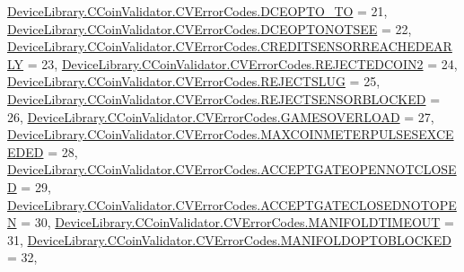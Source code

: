 \begin{DoxyCompactItemize}
\mbox{\hyperlink{group___erreur_gga68c5b73cc3b337502d9f92154d933591abcdd757e0380f69f13dff8be4d7d247f}{Device\+Library.\+C\+Coin\+Validator.\+C\+V\+Error\+Codes.\+D\+C\+E\+O\+P\+T\+O\+\_\+\+TO}} = 21, 
\mbox{\hyperlink{group___erreur_gga68c5b73cc3b337502d9f92154d933591a31c99e9aae78a22cd697c80f35779083}{Device\+Library.\+C\+Coin\+Validator.\+C\+V\+Error\+Codes.\+D\+C\+E\+O\+P\+T\+O\+N\+O\+T\+S\+EE}} = 22, 
\mbox{\hyperlink{group___erreur_gga68c5b73cc3b337502d9f92154d933591a6fd6e43dc5f964d3b48ad0c245d9dc50}{Device\+Library.\+C\+Coin\+Validator.\+C\+V\+Error\+Codes.\+C\+R\+E\+D\+I\+T\+S\+E\+N\+S\+O\+R\+R\+E\+A\+C\+H\+E\+D\+E\+A\+R\+LY}} = 23, 
\newline
\mbox{\hyperlink{group___erreur_gga68c5b73cc3b337502d9f92154d933591aed7cae4a3226e4da365e7c9c5a8d347f}{Device\+Library.\+C\+Coin\+Validator.\+C\+V\+Error\+Codes.\+R\+E\+J\+E\+C\+T\+E\+D\+C\+O\+I\+N2}} = 24, 
\mbox{\hyperlink{group___erreur_gga68c5b73cc3b337502d9f92154d933591a21aa9d7cf65b4208ae81a40097ce9d26}{Device\+Library.\+C\+Coin\+Validator.\+C\+V\+Error\+Codes.\+R\+E\+J\+E\+C\+T\+S\+L\+UG}} = 25, 
\mbox{\hyperlink{group___erreur_gga68c5b73cc3b337502d9f92154d933591a8823666fd9f278f2700a27f91799b65d}{Device\+Library.\+C\+Coin\+Validator.\+C\+V\+Error\+Codes.\+R\+E\+J\+E\+C\+T\+S\+E\+N\+S\+O\+R\+B\+L\+O\+C\+K\+ED}} = 26, 
\mbox{\hyperlink{group___erreur_gga68c5b73cc3b337502d9f92154d933591acd4f575618900c07705e0f3ed6a72a16}{Device\+Library.\+C\+Coin\+Validator.\+C\+V\+Error\+Codes.\+G\+A\+M\+E\+S\+O\+V\+E\+R\+L\+O\+AD}} = 27, 
\newline
\mbox{\hyperlink{group___erreur_gga68c5b73cc3b337502d9f92154d933591acb5a7731b62453102c5cd6211bc6a6f8}{Device\+Library.\+C\+Coin\+Validator.\+C\+V\+Error\+Codes.\+M\+A\+X\+C\+O\+I\+N\+M\+E\+T\+E\+R\+P\+U\+L\+S\+E\+S\+E\+X\+C\+E\+E\+D\+ED}} = 28, 
\mbox{\hyperlink{group___erreur_gga68c5b73cc3b337502d9f92154d933591a713b07a2ec4a9014b2fdb72c5d8d8980}{Device\+Library.\+C\+Coin\+Validator.\+C\+V\+Error\+Codes.\+A\+C\+C\+E\+P\+T\+G\+A\+T\+E\+O\+P\+E\+N\+N\+O\+T\+C\+L\+O\+S\+ED}} = 29, 
\mbox{\hyperlink{group___erreur_gga68c5b73cc3b337502d9f92154d933591ad697f2db067ec6160ac3c98dbd7acbc3}{Device\+Library.\+C\+Coin\+Validator.\+C\+V\+Error\+Codes.\+A\+C\+C\+E\+P\+T\+G\+A\+T\+E\+C\+L\+O\+S\+E\+D\+N\+O\+T\+O\+P\+EN}} = 30, 
\mbox{\hyperlink{group___erreur_gga68c5b73cc3b337502d9f92154d933591a1f2e8ea805df9a9e6a9128576e2f342b}{Device\+Library.\+C\+Coin\+Validator.\+C\+V\+Error\+Codes.\+M\+A\+N\+I\+F\+O\+L\+D\+T\+I\+M\+E\+O\+UT}} = 31, 
\newline
\mbox{\hyperlink{group___erreur_gga68c5b73cc3b337502d9f92154d933591a30272f8d3111e39e72b1bea11c4a2906}{Device\+Library.\+C\+Coin\+Validator.\+C\+V\+Error\+Codes.\+M\+A\+N\+I\+F\+O\+L\+D\+O\+P\+T\+O\+B\+L\+O\+C\+K\+ED}} = 32, 

\end{DoxyCompactItemize}
